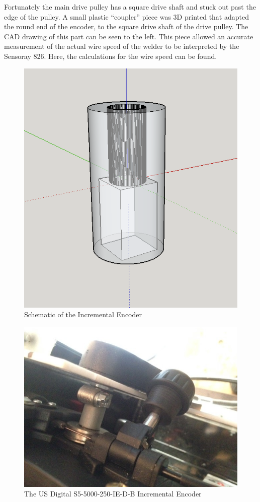 \documentclass[12pt]{article}
\begin{document}
Fortunately the main drive pulley has a square drive shaft and stuck out past the edge of the pulley. A small plastic “coupler” piece was 3D printed that adapted the round end of the encoder, to the square drive shaft of the drive pulley. The CAD drawing of this part can be seen to the left. This piece allowed an accurate measurement of the actual wire speed of the welder to be interpreted by the Sensoray 826. Here, the calculations for the wire speed can be found.

\clearpage

\begin{figure}[!h]
\centering
\includegraphics[scale=0.5]{enc}
\caption{Schematic of the Incremental Encoder}
\end{figure}

\begin{figure}[!h]
\centering
\includegraphics[scale=0.5]{encreal}
\caption{The US Digital S5-5000-250-IE-D-B Incremental Encoder}
\end{figure}
\end{document}
